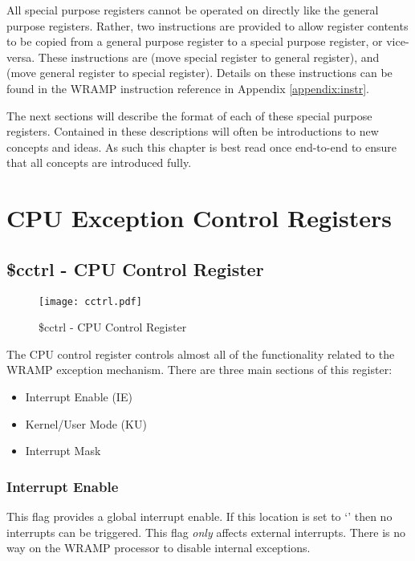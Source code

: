 All special purpose registers cannot be operated on directly like
the general purpose registers. Rather, two instructions are provided
to allow register contents to be copied from a general purpose
register to a special purpose register, or vice-versa. These
instructions are  (move special register to general
register), and  (move general register to special
register). Details on these instructions can be found in the WRAMP
instruction reference in Appendix \ref{appendix:instr}.

The next sections will describe the format of each of these special
purpose registers. Contained in these descriptions will often be
introductions to new concepts and ideas. As such this chapter is best
read once end-to-end to ensure that all concepts are introduced fully.

\section{CPU Exception Control Registers}

\subsection{\$cctrl - CPU Control Register}

\begin{figure}[h]
\begin{center}
\texttt{[image: cctrl.pdf]}
\caption{\$cctrl - CPU Control Register}
\label{cctrl_pic}
\end{center}
\end{figure}

The CPU control register controls almost all of the functionality
related to the WRAMP exception mechanism. There are three main
sections of this register:

\begin{itemize}
\item Interrupt Enable (IE)
\item Kernel/User Mode (KU)
\item Interrupt Mask
\end{itemize}

\subsubsection{Interrupt Enable}

This flag provides a global interrupt enable. If this location is set
to `' then no interrupts can be triggered. This flag
\emph{only} affects external interrupts. There is no way on the WRAMP
processor to disable internal exceptions.


